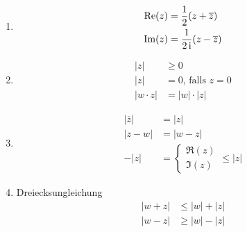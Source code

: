 \begin{enumerate}

\item
  \begin{align*}
  \operatorname{Re}(z) & = \frac{1}{2} (z+\overline{z}) \\
  \operatorname{Im}(z) & = \frac{1}{2\operatorname{i}} (z - \overline{z})
  \end{align*}

\item
  \begin{align*}
  |z| & \geq 0 \\
  |z| & = 0 \text{, falls } z=0 \\
  |w\cdot z| & = |w| \cdot |z|
  \end{align*}

\item
  \begin{align*}
  |\overline{z}| & = |z| \\
  |z - w| & = |w - z| \\
  -|z| & = \begin{cases} \Re(z) \\ \Im(z) \end{cases} \leq |z|
  \end{align*}

\item Dreiecksungleichung
  \begin{align*}
  |w + z| & \leq |w| + |z| \\
  |w - z| & \geq |w| - |z|
  \end{align*}
\end{enumerate}


